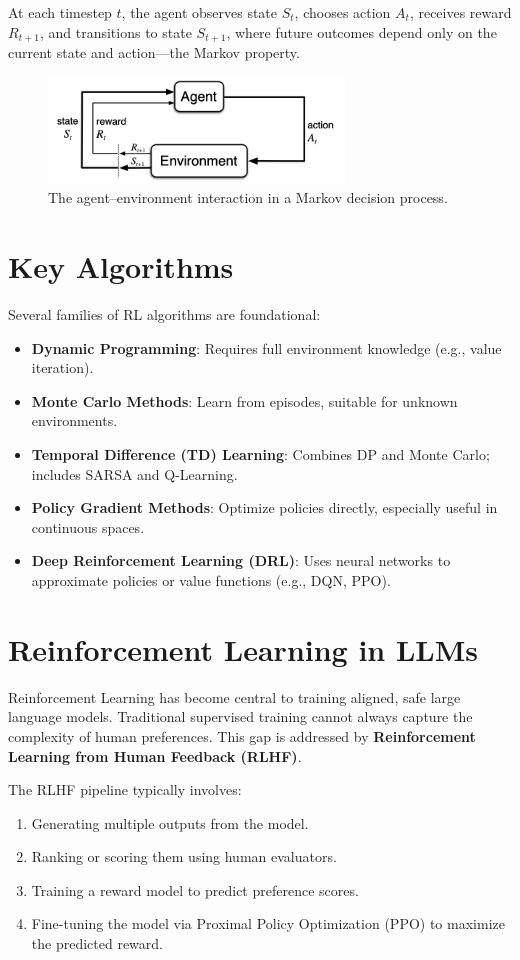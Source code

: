 \documentclass[11pt]{article}
\begin{document}
At each timestep $t$, the agent observes state $S_t$, chooses action $A_t$, receives reward $R_{t+1}$, and transitions to state $S_{t+1}$, where future outcomes depend only on the current state and action---the Markov property.

\begin{figure}[h]
    \centering
    \includegraphics[width=0.7\textwidth]{mdp.png}
    \caption{The agent–environment interaction in a Markov decision process.}
    \label{fig:mdp}
\end{figure} 
\newpage
\section{Key Algorithms}
Several families of RL algorithms are foundational:
\begin{itemize}[noitemsep]
    \item \textbf{Dynamic Programming}: Requires full environment knowledge (e.g., value iteration).
    \item \textbf{Monte Carlo Methods}: Learn from episodes, suitable for unknown environments.
    \item \textbf{Temporal Difference (TD) Learning}: Combines DP and Monte Carlo; includes SARSA and Q-Learning.
    \item \textbf{Policy Gradient Methods}: Optimize policies directly, especially useful in continuous spaces.
    \item \textbf{Deep Reinforcement Learning (DRL)}: Uses neural networks to approximate policies or value functions (e.g., DQN, PPO).
\end{itemize}

\section{Reinforcement Learning in LLMs}
Reinforcement Learning has become central to training aligned, safe large language models. Traditional supervised training cannot always capture the complexity of human preferences. This gap is addressed by \textbf{Reinforcement Learning from Human Feedback (RLHF)}.

The RLHF pipeline typically involves:
\begin{enumerate}[noitemsep]
    \item Generating multiple outputs from the model.
    \item Ranking or scoring them using human evaluators.
    \item Training a reward model to predict preference scores.
    \item Fine-tuning the model via Proximal Policy Optimization (PPO) to maximize the predicted reward.
\end{enumerate}
\end{document}
